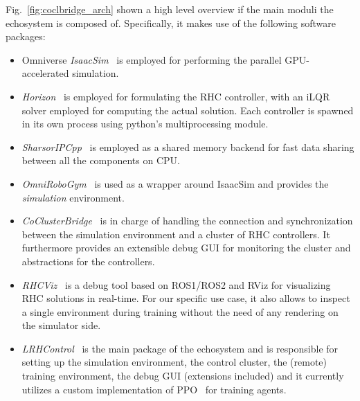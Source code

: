 Fig.~\ref{fig:coclbridge_arch} shown a high level overview if the main moduli the echosystem is composed of. Specifically, it makes use of the following software packages:
\begin{itemize}
	\item Omniverse \textit{IsaacSim}~\cite{rl:makoviychuk2021isaac} is employed for performing the parallel GPU-accelerated simulation.
	\item \textit{Horizon}~\cite{frameworks::horizon_to} is employed for formulating the RHC controller, with an iLQR solver employed for computing the actual solution. Each controller is spawned in its own process using python's multiprocessing module.
	\item \textit{SharsorIPCpp}~\cite{mystuff::sharsoripcpp} is employed as a shared memory backend for fast data sharing between all the components on CPU.
	\item \textit{OmniRoboGym}~\cite{mystuff::omnirobogym} is used as a wrapper around IsaacSim and provides the \textit{simulation} environment.
	\item \textit{CoClusterBridge}~\cite{mystuff::coclusterbridge} is in charge of handling the connection and synchronization between the simulation environment and a cluster of RHC controllers. It furthermore provides an extensible debug GUI for monitoring the cluster and abstractions for the controllers.
	\item \textit{RHCViz}~\cite{mystuff::rhcviz} is a debug tool based on ROS1/ROS2 and RViz for visualizing RHC solutions in real-time. For our specific use case, it also allows to inspect a single environment during training without the need of any rendering on the simulator side.
	\item \textit{LRHControl}~\cite{mystuff::lrhccontrol} is the main package of the echosystem and is responsible for setting up the simulation environment, the control cluster, the (remote) training environment, the debug GUI (extensions included) and it currently utilizes a custom implementation of PPO~\cite{rl:schulman2017proximal} for training agents.
\end{itemize}




